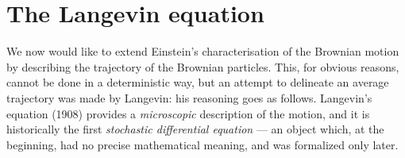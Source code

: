 \section{The Langevin equation}

We now would like to extend Einstein's characterisation of the Brownian motion by describing the trajectory of the Brownian particles.
This, for obvious reasons, cannot be done in a deterministic way, but an attempt to delineate an average trajectory was made by Langevin: his reasoning goes as follows.
Langevin's equation (1908)\cite{Langevin1908} provides a \emph{microscopic} description of the motion, and it is historically the first \emph{stochastic differential equation} --- an object which, at the beginning, had no precise mathematical meaning, and was formalized only later.

